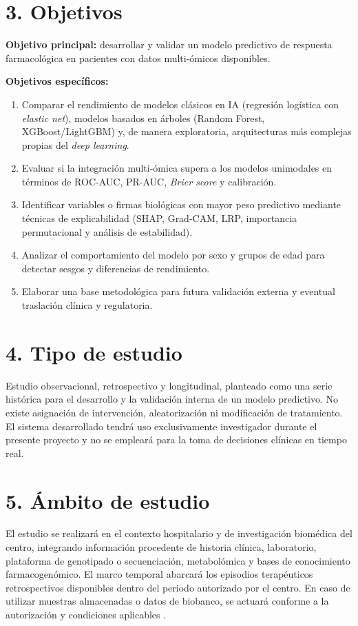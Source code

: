 \documentclass[11pt,a4paper]{article}
\begin{document}
\section*{3. Objetivos}
\textbf{Objetivo principal:} desarrollar y validar un modelo predictivo de
respuesta farmacológica en pacientes con datos multi-ómicos disponibles.

\textbf{Objetivos específicos:}
\begin{enumerate}
    \item Comparar el rendimiento de modelos clásicos en IA (regresión logística
    con \textit{elastic net}), modelos basados en árboles (Random Forest,
    XGBoost/LightGBM) y, de manera exploratoria, arquitecturas más complejas
    propias del \textit{deep learning}.
    \item Evaluar si la integración multi-ómica supera a los modelos unimodales
    en términos de ROC-AUC, PR-AUC, \textit{Brier score} y calibración.
    \item Identificar variables o firmas biológicas con mayor peso predictivo
    mediante técnicas de explicabilidad (SHAP, Grad-CAM, LRP, importancia
    permutacional y análisis de estabilidad).
    \item Analizar el comportamiento del modelo por sexo y grupos de edad para
    detectar sesgos y diferencias de rendimiento.
    \item Elaborar una base metodológica para futura validación externa y
    eventual traslación clínica y regulatoria.
\end{enumerate}

\section*{4. Tipo de estudio}
Estudio observacional, retrospectivo y longitudinal, planteado como
una serie histórica para el desarrollo y la validación interna de un modelo
predictivo.
No existe asignación de intervención, aleatorización ni modificación de
tratamiento. El sistema desarrollado tendrá uso exclusivamente investigador
durante el presente proyecto y no se empleará para la toma de decisiones
clínicas en tiempo real.

\section*{5. Ámbito de estudio}
El estudio se realizará en el contexto hospitalario y de investigación biomédica
del centro, integrando información procedente de historia clínica, laboratorio,
plataforma de genotipado o secuenciación, metabolómica y bases de conocimiento
farmacogenómico. El marco temporal abarcará los episodios terapéuticos
retrospectivos disponibles dentro del periodo autorizado por el centro. En caso
de utilizar muestras almacenadas o datos de biobanco, se actuará conforme a la
autorización y condiciones aplicables \cite{autonomia,biobancos}.
\end{document}
